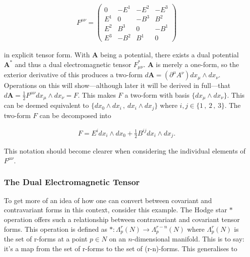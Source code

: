 \documentclass[fleqn, twocolumn, 10pt]{article}
\begin{document}
\begin{ceqn}
\begin{align*}
F^{\mu\nu} =
\begin{pmatrix}
0 & -E^1 & -E^2 & -E^3\\
E^1 & 0 & -B^3 & B^2\\
E^2 & B^3 & 0 & -B^1\\
E^3 & -B^2 & B^1 & 0
\end{pmatrix}
\end{align*}
\end{ceqn}
in explicit tensor form. With $\mathbf{A}$ being a potential, there exists a dual potential $\mathbf{A}^*$ and thus a dual electromagnetic tensor $F^*_{\mu\nu}$. $\mathbf{A}$ is merely a one-form, so the exterior derivative of this produces a two-form $d\mathbf{A} = \left(\partial^\mu A^{\nu}\right) dx_\mu \land dx_\nu$. Operations on this will show---although later it will be derived in full---that $d\mathbf{A} = \frac{1}{2}F^{\mu\nu} dx_\mu \land dx_\nu = F$. This makes $F$ a two-form with basis $\{ dx_\mu \land dx_\nu\}$. This can be deemed equivalent to $\{ dx_0 \land dx_i\,,\: dx_i \land dx_j\}$ where $i, j \in \{ 1\,,\: 2\,,\: 3\}$. The two-form $F$ can be decomposed into

\begin{ceqn} 
\begin{align} \tag{4}
F = E^idx_i\land dx_0+ \frac{1}{2}B^{ij}dx_i \land dx_j.
\end{align}
\end{ceqn}
This notation should become clearer when considering the individual elements of $F^{\mu\nu}$.


\subsubsection{The Dual Electromagnetic Tensor}

To get more of an idea of how one can convert between covariant and contravariant forms in this context, consider this example. The Hodge star $\ast$ operation offers such a relationship between contravariant and covariant tensor forms. This operation is defined as $\ast: \Lambda^r_p(N) \to \Lambda^{r-n}_p(N)$ where $\Lambda^r_p(N)$ is the set of r-forms at a point $p \in N$ on an $n$-dimensional manifold. This is to say: it's a map from the set of r-forms to the set of (r-n)-forms. This generalises to
\end{document}
